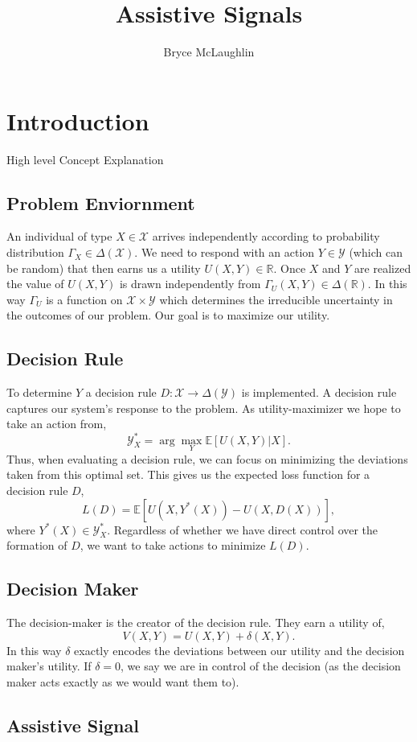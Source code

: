 \documentclass[10pt]{article}
\title{Assistive Signals}
\author{Bryce McLaughlin}
\newcommand{\R}{\mathbb{R}}
\newcommand{\X}{\mathcal{X}}
\newcommand{\Y}{\mathcal{Y}}
\newcommand{\E}{\mathbb{E}}
\begin{document}
\section*{Introduction}

High level Concept Explanation

\subsection*{Problem Enviornment}

An individual of type $X \in \X$ arrives independently according to probability distribution $\Gamma_X \in \Delta(\X)$. We need to respond with an action $Y \in \Y$ (which can be random) that then earns us a utility $U(X,Y) \in \R$. Once $X$ and $Y$ are realized the value of $U(X,Y)$ is drawn independently from $\Gamma_U(X,Y) \in \Delta(\mathbb{R}).$ In this way $\Gamma_U$ is a function on $\X \times \Y$ which determines the irreducible uncertainty in the outcomes of our problem. Our goal is to maximize our utility.

\subsection*{Decision Rule}

To determine $Y$ a decision rule $D:\X \to \Delta(\Y)$ is implemented. A decision rule captures our system's response to the problem. As utility-maximizer we hope to take an action from,
$$\Y^*_X = \arg\max_Y \E[U(X,Y)|X].$$
Thus, when evaluating a decision rule, we can focus on minimizing the deviations taken from this optimal set. This gives us the expected loss function for a decision rule $D$,
$$L(D) = \E[U(X,Y^*(X)) - U(X,D(X))],$$
where $Y^*(X) \in \Y^*_X$. Regardless of whether we have direct control over the formation of $D$, we want to take actions to minimize $L(D).$

\subsection*{Decision Maker}

The decision-maker is the creator of the decision rule. They earn a utility of,
$$V(X,Y) = U(X,Y) + \delta(X,Y).$$
In this way $\delta$ exactly encodes the deviations between our utility and the decision maker's utility. If $\delta = 0$, we say we are in control of the decision (as the decision maker acts exactly as we would want them to).



\subsection*{Assistive Signal}
\end{document}
